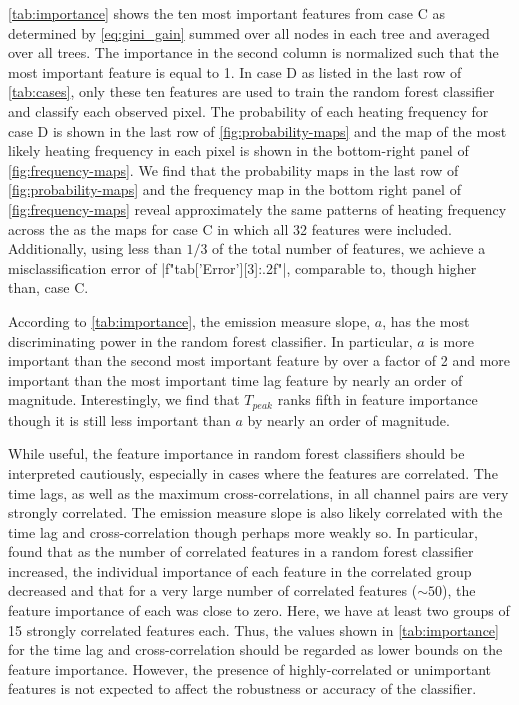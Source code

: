 \autoref{tab:importance} shows the ten most important features from case C as determined by \autoref{eq:gini_gain} summed over all nodes in each tree and averaged over all trees.
The importance in the second column is normalized such that the most important feature is equal to 1.
In case D as listed in the last row of \autoref{tab:cases}, only these ten features are used to train the random forest classifier and classify each observed pixel.
The probability of each heating frequency for case D is shown in the last row of \autoref{fig:probability-maps} and the map of the most likely heating frequency in each pixel is shown in the bottom-right panel of \autoref{fig:frequency-maps}.
We find that the probability maps in the last row of \autoref{fig:probability-maps} and the frequency map in the bottom right panel of \autoref{fig:frequency-maps} reveal approximately the same patterns of heating frequency across the \AR{} as the maps for case C in which all 32 features were included.
Additionally, using less than $1/3$ of the total number of features, we achieve a misclassification error of \py[manager_ml]|f"{tab['Error'][3]:.2f}"|, comparable to, though higher than, case C.

According to \autoref{tab:importance}, the emission measure slope, $a$, has the most discriminating power in the random forest classifier.
In particular, $a$ is more important than the second most important feature by over a factor of 2 and more important than the most important time lag feature by nearly an order of magnitude.
Interestingly, we find that $T_{peak}$ ranks fifth in feature importance though it is still less important than $a$ by nearly an order of magnitude.

While useful, the feature importance in random forest classifiers should be interpreted cautiously, especially in cases where the features are correlated.
The time lags, as well as the maximum cross-correlations, in all channel pairs are very strongly correlated.
The emission measure slope is also likely correlated with the time lag and cross-correlation though perhaps more weakly so.
In particular, \citet{altmann_permutation_2010} found that as the number of correlated features in a random forest classifier increased, the individual importance of each feature in the correlated group decreased and that for a very large number of correlated features ($\sim50$), the feature importance of each was close to zero.
Here, we have at least two groups of 15 strongly correlated features each.
Thus, the values shown in \autoref{tab:importance} for the time lag and cross-correlation should be regarded as lower bounds on the feature importance. 
However, the presence of highly-correlated or unimportant features is not expected to affect the robustness or accuracy of the classifier.
